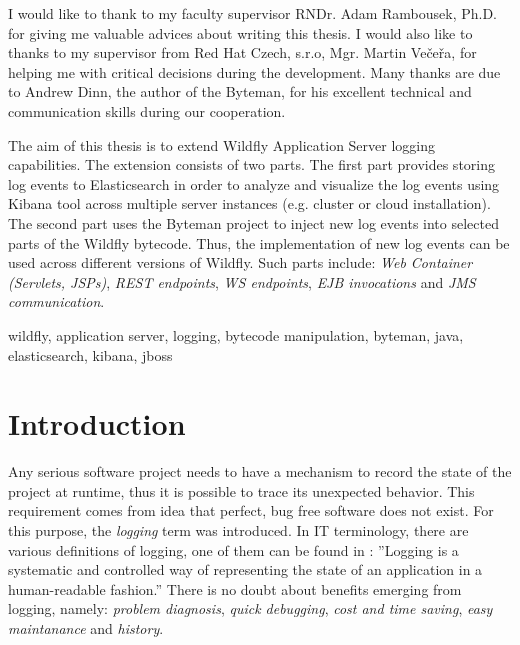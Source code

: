 \documentclass[12pt,oneside]{fithesis2}
\begin{document}
  \FrontMatter                    %
    \ThesisTitlePage                %
    \begin{ThesisDeclaration}       %
      \DeclarationText
      \AdvisorName
    \end{ThesisDeclaration}
    \begin{ThesisThanks}            %
      I would like to thank to my faculty supervisor RNDr. Adam Rambousek, Ph.D. for giving me valuable advices about writing this thesis. I would also like to thanks to my supervisor from Red Hat Czech, s.r.o, Mgr. Martin Večeřa, for helping me with critical decisions during the development. Many thanks are due to Andrew Dinn, the author of the Byteman, for his excellent technical and communication skills during our cooperation.
    \end{ThesisThanks}
    \begin{ThesisAbstract}          %
      The aim of this thesis is to extend Wildfly Application Server logging capabilities. The extension consists of two parts. The first part provides storing log events to Elasticsearch in order to analyze and visualize the log events using Kibana tool across multiple server instances (e.g. cluster or cloud installation). The second part uses the Byteman project to inject new log events into selected parts of the Wildfly bytecode. Thus, the implementation of new log events can be used across different versions of Wildfly. Such parts include: \textit{Web Container (Servlets, JSPs)}, \textit{REST endpoints}, \textit{WS endpoints}, \textit{EJB invocations} and \textit{JMS communication}.
    \end{ThesisAbstract}
    \begin{ThesisKeyWords}          %
      wildfly, application server, logging, bytecode manipulation, byteman, java, elasticsearch, kibana, jboss
    \end{ThesisKeyWords}
    \tableofcontents                %
  
  \MainMatter                     %
\chapter{Introduction}
Any serious software project needs to have a mechanism to record the state of the project at runtime, thus it is possible to trace its unexpected behavior. This requirement comes from idea that perfect, bug free software does not exist. For this purpose, the \textit{logging} term was introduced. In IT terminology, there are various definitions of logging, one of them can be found in \cite{java_logging}: ''Logging is a systematic and controlled way of representing the state of an application in a human-readable fashion.'' There is no doubt about benefits emerging from logging, namely: \textit{problem diagnosis}, \textit{quick debugging}, \textit{cost and time saving}, \textit{easy maintanance} and \textit{history}.
\end{document}
